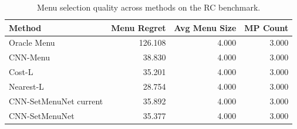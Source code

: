 \begin{table}[t]
\centering
\small
\setlength{\tabcolsep}{4pt}
\caption{Menu selection quality across methods on the RC benchmark.}
\label{tab:work2_remediation_smoke_menu_regret}
\begin{tabular}{@{}lrrr@{}}
\hline
Method & Menu Regret & Avg Menu Size & MP Count \\
\hline
Oracle Menu & 126.108 & 4.000 & 3.000 \\
CNN-Menu & 38.830 & 4.000 & 3.000 \\
Cost-L & 35.201 & 4.000 & 3.000 \\
Nearest-L & 28.754 & 4.000 & 3.000 \\
CNN-SetMenuNet current & 35.892 & 4.000 & 3.000 \\
CNN-SetMenuNet & 35.377 & 4.000 & 3.000 \\
\hline
\end{tabular}
\end{table}
